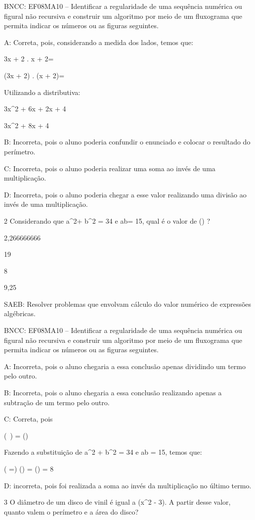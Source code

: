 {BNCC: EF08MA10 -- Identificar a regularidade de uma sequência numérica
ou figural não recursiva e construir um algoritmo por meio de um
fluxograma que permita indicar os números ou as figuras seguintes.

A: Correta, pois, considerando a medida dos lados, temos que:

3x + 2 . x + 2=

(3x + 2) . (x + 2)=

Utilizando a distributiva:

3x^2 + 6x + 2x + 4

3x^2 + 8x + 4

B: Incorreta, pois o aluno poderia confundir o enunciado e colocar o
resultado do perímetro.

C: Incorreta, pois o aluno poderia realizar uma soma ao invés de uma
multiplicação.

D: Incorreta, pois o aluno poderia chegar a esse valor realizando uma
divisão ao invés de uma multiplicação.

\num{2} Considerando que a^2+ b^2 = 34 e ab= 15, qual é o valor de
() ?
\item 2,266666666
\item 19
\item 8
\item 9,25

SAEB: Resolver problemas que envolvam cálculo do valor numérico de
expressões algébricas.

BNCC: EF08MA10 -- Identificar a regularidade de uma sequência numérica
ou figural não recursiva e construir um algoritmo por meio de um
fluxograma que permita indicar os números ou as figuras seguintes.

A: Incorreta, pois o aluno chegaria a essa conclusão apenas dividindo um
termo pelo outro.

B: Incorreta, pois o aluno chegaria a essa conclusão realizando apenas a
subtração de um termo pelo outro.

C: Correta, pois

(\ ) = ()

Fazendo a substituição de a^2 + b^2 = 34 e ab = 15, temos que:

( =) () = () = 8

D: incorreta, pois foi realizada a soma ao invés da multiplicação no
último termo.

\num{3} O diâmetro de um disco de vinil é igual a (x^2 - 3). A partir desse
valor, quanto valem o perímetro e a área do disco?

}
